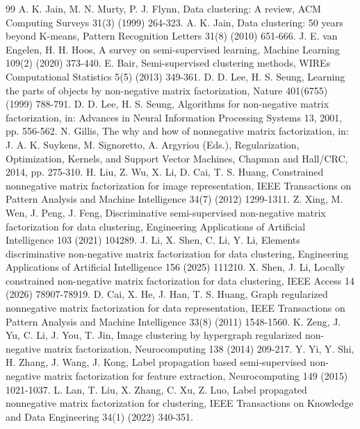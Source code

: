 \documentclass[a4paper,preprint,12pt]{elsarticle}
\theoremstyle{remark}
\begin{document}
\begin{thebibliography}{99}
 A. K. Jain, M. N. Murty, P. J. Flynn, Data clustering: A review, ACM Computing Surveys 31(3) (1999) 264-323.
 A. K. Jain, Data clustering: 50 years beyond K-means, Pattern Recognition Letters 31(8) (2010) 651-666.
 J. E. van Engelen, H. H. Hoos, A survey on semi-supervised learning, Machine Learning 109(2) (2020) 373-440.
 E. Bair, Semi-supervised clustering methods, WIREs Computational Statistics 5(5) (2013) 349-361.
 D. D. Lee, H. S. Seung, Learning the parts of objects by non-negative matrix factorization, Nature 401(6755) (1999) 788-791.
 D. D. Lee, H. S. Seung, Algorithms for non-negative matrix factorization, in: Advances in Neural Information Processing Systems 13, 2001, pp. 556-562.
 N. Gillis, The why and how of nonnegative matrix factorization, in: J. A. K. Suykens, M. Signoretto, A. Argyriou (Eds.), Regularization, Optimization, Kernels, and Support Vector Machines, Chapman and Hall/CRC, 2014, pp. 275-310.
 H. Liu, Z. Wu, X. Li, D. Cai, T. S. Huang, Constrained nonnegative matrix factorization for image representation, IEEE Transactions on Pattern Analysis and Machine Intelligence 34(7) (2012) 1299-1311.
 Z. Xing, M. Wen, J. Peng, J. Feng, Discriminative semi-supervised non-negative matrix factorization for data clustering, Engineering Applications of Artificial Intelligence 103 (2021) 104289.
 J. Li, X. Shen, C. Li, Y. Li, Elements discriminative non-negative matrix factorization for data clustering, Engineering Applications of Artificial Intelligence 156 (2025) 111210.
 X. Shen, J. Li, Locally constrained non-negative matrix factorization for data clustering, IEEE Access 14 (2026) 78907-78919.
 D. Cai, X. He, J. Han, T. S. Huang, Graph regularized nonnegative matrix factorization for data representation, IEEE Transactions on Pattern Analysis and Machine Intelligence 33(8) (2011) 1548-1560.
 K. Zeng, J. Yu, C. Li, J. You, T. Jin, Image clustering by hypergraph regularized non-negative matrix factorization, Neurocomputing 138 (2014) 209-217.
 Y. Yi, Y. Shi, H. Zhang, J. Wang, J. Kong, Label propagation based semi-supervised non-negative matrix factorization for feature extraction, Neurocomputing 149 (2015) 1021-1037.
 L. Lan, T. Liu, X. Zhang, C. Xu, Z. Luo, Label propagated nonnegative matrix factorization for clustering, IEEE Transactions on Knowledge and Data Engineering 34(1) (2022) 340-351.

\end{thebibliography}
\end{document}
